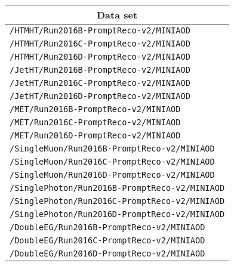 \begin{center}
\begin{tabular}{l}
\hline\hline
\multicolumn{1}{c}{Data set}\tabularnewline
\hline
\verb!/HTMHT/Run2016B-PromptReco-v2/MINIAOD!\tabularnewline
\verb!/HTMHT/Run2016C-PromptReco-v2/MINIAOD!\tabularnewline
\verb!/HTMHT/Run2016D-PromptReco-v2/MINIAOD!\tabularnewline
\verb!/JetHT/Run2016B-PromptReco-v2/MINIAOD!\tabularnewline
\verb!/JetHT/Run2016C-PromptReco-v2/MINIAOD!\tabularnewline
\verb!/JetHT/Run2016D-PromptReco-v2/MINIAOD!\tabularnewline
\verb!/MET/Run2016B-PromptReco-v2/MINIAOD!\tabularnewline
\verb!/MET/Run2016C-PromptReco-v2/MINIAOD!\tabularnewline
\verb!/MET/Run2016D-PromptReco-v2/MINIAOD!\tabularnewline
\verb!/SingleMuon/Run2016B-PromptReco-v2/MINIAOD!\tabularnewline
\verb!/SingleMuon/Run2016C-PromptReco-v2/MINIAOD!\tabularnewline
\verb!/SingleMuon/Run2016D-PromptReco-v2/MINIAOD!\tabularnewline
\verb!/SinglePhoton/Run2016B-PromptReco-v2/MINIAOD!\tabularnewline
\verb!/SinglePhoton/Run2016C-PromptReco-v2/MINIAOD!\tabularnewline
\verb!/SinglePhoton/Run2016D-PromptReco-v2/MINIAOD!\tabularnewline
\verb!/DoubleEG/Run2016B-PromptReco-v2/MINIAOD!\tabularnewline
\verb!/DoubleEG/Run2016C-PromptReco-v2/MINIAOD!\tabularnewline
\verb!/DoubleEG/Run2016D-PromptReco-v2/MINIAOD!\tabularnewline
\hline
\end{tabular}\end{center}
